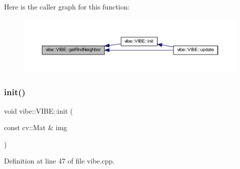 Here is the caller graph for this function\+:\nopagebreak
\begin{figure}[H]
\begin{center}
\leavevmode
\includegraphics[width=350pt]{classvibe_1_1_v_i_b_e_a5ca071697edce3a8459f93cba2386516_icgraph}
\end{center}
\end{figure}
\mbox{\label{classvibe_1_1_v_i_b_e_a4db865cd319617161c13e4303471c33e}} 
\subsubsection{\texorpdfstring{init()}{init()}}
{\footnotesize\ttfamily void vibe\+::\+V\+I\+B\+E\+::init (\begin{DoxyParamCaption}\item[{const cv\+::\+Mat \&}]{img }\end{DoxyParamCaption})\hspace{0.3cm}{\ttfamily [private]}}



Definition at line 47 of file vibe.\+cpp.


